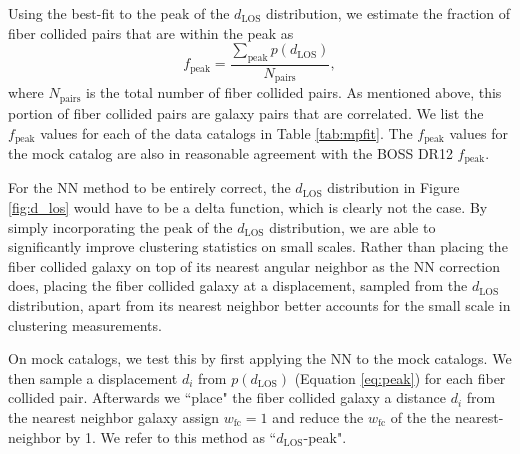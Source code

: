 \documentclass{emulateapj}
\begin{document}
Using the best-fit to the peak of the $d_{\mathrm{LOS}}$ distribution, we estimate the fraction of fiber collided pairs that are within the peak as
\begin{equation} \label{eq:fpeak}
f_{\mathrm{peak}} = \frac{\sum\limits_{\mathrm{peak}} p(d_{\mathrm{LOS}})}{N_{\mathrm{pairs}}}, 
\end{equation}
where $N_{\mathrm{pairs}}$ is the total number of fiber collided pairs. As mentioned above, this portion of fiber collided pairs are galaxy pairs that are correlated. We list the $f_{\mathrm{peak}}$ values for each of the data catalogs in Table \ref{tab:mpfit}. The $f_\mathrm{peak}$ values for the mock catalog are also in reasonable agreement with the BOSS DR12 $f_\mathrm{peak}$. 

For the NN method to be entirely correct, the $d_{\mathrm{LOS}}$ distribution in Figure \ref{fig:d_los} would have to be a delta function, which is clearly not the case. By simply incorporating the peak of the $d_{\mathrm{LOS}}$ distribution, we are able to significantly improve clustering statistics on small scales. Rather than placing the fiber collided galaxy on top of its nearest angular neighbor as the NN correction does, placing the fiber collided galaxy at a displacement, sampled from the $d_{\mathrm{LOS}}$ distribution, apart from its nearest neighbor better accounts for the small scale in clustering measurements. 


On mock catalogs, we test this by first applying the NN to the mock catalogs. We then sample a displacement $d_i$ from $p(d_\mathrm{LOS})$ (Equation \ref{eq:peak}) for each fiber collided pair. Afterwards we ``place" the fiber collided galaxy a distance $d_i$ from the nearest neighbor galaxy assign $w_\mathrm{fc} = 1$ and reduce the $w_\mathrm{fc}$ of the the nearest-neighbor by 1. We refer to this method as ``$d_\mathrm{LOS}$-peak". 

\end{document}
